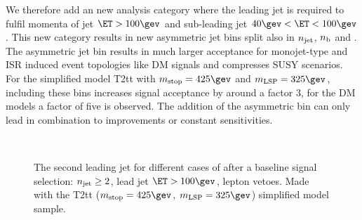 We therefore add an new analysis category where the leading jet is required to fulfil 
momenta of jet $\ET>100\gev$ and sub-leading jet $40\gev<\ET<100\gev$. This new category 
results in new asymmetric jet bins split also in $\njet$, $\nb$ and \HT. The asymmetric jet bin
results in much larger acceptance for monojet-type and ISR induced event topologies like DM signals
and compresses SUSY scenarios. 
For the simplified model T2tt with $m_{\rm stop}=425\gev$ and $m_{\rm LSP}=325\gev$, 
including these bins increases signal acceptance by around a factor 3, for the DM models a factor of five is observed.
The addition of the asymmetric bin can only lead in combination to improvements or constant sensitivities.
\begin{figure}[h!]
  \centering
  ~~
  \\
  \caption{\label{fig:asymMotivation} The second leading jet \PT for different
  cases of \HT after a baseline signal selection: $\njet\geq2$, lead jet
  $\ET>100\gev$, lepton vetoes. Made with the T2tt ($m_{\rm
    stop}=425\gev$, $m_{\rm LSP}=325\gev$) simplified model sample.}
\end{figure}

